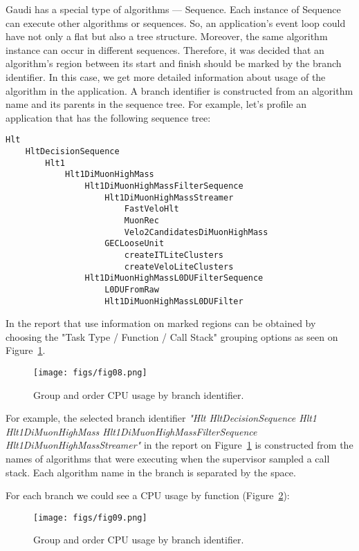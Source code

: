 \documentclass[a4paper]{jpconf}
\begin{document}
Gaudi has a special type of algorithms --- Sequence. Each instance of Sequence can execute other algorithms or 
sequences. So, an application's event loop could have not only a flat but also a tree structure. Moreover, the same 
algorithm instance can occur in different sequences. Therefore, it was decided that an algorithm's region between its start 
and finish should be marked by the branch identifier. In this case, we get more detailed information about usage of 
the algorithm in the application. A branch identifier is constructed from an algorithm name and its parents 
in the sequence tree. For example, let's profile an application that has the following sequence tree:
\begin{verbatim}
Hlt 
    HltDecisionSequence 
        Hlt1 
            Hlt1DiMuonHighMass
                Hlt1DiMuonHighMassFilterSequence
                    Hlt1DiMuonHighMassStreamer
                        FastVeloHlt
                        MuonRec
                        Velo2CandidatesDiMuonHighMass
                    GECLooseUnit
                        createITLiteClusters
                        createVeloLiteClusters
                Hlt1DiMuonHighMassL0DUFilterSequence
                    L0DUFromRaw
                    Hlt1DiMuonHighMassL0DUFilter
\end{verbatim}

In \amp the report that use information on marked regions can be obtained by choosing the 
"Task Type / Function / Call Stack" grouping options as seen on Figure~\ref{fig08}.

\begin{figure}[H]
\begin{minipage}{\textwidth}
\texttt{[image: figs/fig08.png]}
\caption{\label{fig08}Group and order CPU usage by branch identifier.}
\end{minipage}
\end{figure}

For example, the selected branch identifier {\it "Hlt HltDecisionSequence Hlt1 Hlt1DiMuonHighMass Hlt1DiMuonHighMassFilterSequence Hlt1DiMuonHighMassStreamer"} in the report on Figure~\ref{fig08} is constructed from the names of algorithms that were executing 
when the \amp supervisor sampled a call stack. Each algorithm name in the branch is separated by the space. 

For each branch we could see a CPU usage by function (Figure~\ref{fig09}):

\begin{figure}[H]
\begin{minipage}{\textwidth}
\texttt{[image: figs/fig09.png]}
\caption{\label{fig09}Group and order CPU usage by branch identifier.}
\end{minipage}
\end{figure}
\end{document}
